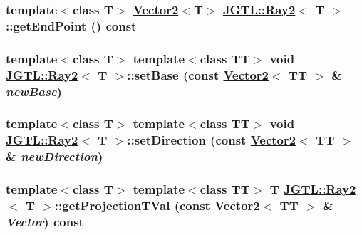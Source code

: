 \hypertarget{class_j_g_t_l_1_1_ray2_2b38de58f57dd042c582fe2f9aa9258a}{
\subsubsection[getEndPoint]{\setlength{\rightskip}{0pt plus 5cm}template$<$class T$>$ \hyperlink{class_j_g_t_l_1_1_vector2}{Vector2}$<$T$>$ \hyperlink{class_j_g_t_l_1_1_ray2}{JGTL::Ray2}$<$ T $>$::get\-End\-Point () const}}
\label{class_j_g_t_l_1_1_ray2_2b38de58f57dd042c582fe2f9aa9258a}


\hypertarget{class_j_g_t_l_1_1_ray2_188eb46e39c7240523863760a7afe756}{
\subsubsection[setBase]{\setlength{\rightskip}{0pt plus 5cm}template$<$class T$>$ template$<$class TT$>$ void \hyperlink{class_j_g_t_l_1_1_ray2}{JGTL::Ray2}$<$ T $>$::set\-Base (const \hyperlink{class_j_g_t_l_1_1_vector2}{Vector2}$<$ TT $>$ \& {\em new\-Base})}}
\label{class_j_g_t_l_1_1_ray2_188eb46e39c7240523863760a7afe756}


\hypertarget{class_j_g_t_l_1_1_ray2_cc31a907c03a3d013694d3f0ac476e47}{
\subsubsection[setDirection]{\setlength{\rightskip}{0pt plus 5cm}template$<$class T$>$ template$<$class TT$>$ void \hyperlink{class_j_g_t_l_1_1_ray2}{JGTL::Ray2}$<$ T $>$::set\-Direction (const \hyperlink{class_j_g_t_l_1_1_vector2}{Vector2}$<$ TT $>$ \& {\em new\-Direction})}}
\label{class_j_g_t_l_1_1_ray2_cc31a907c03a3d013694d3f0ac476e47}


\hypertarget{class_j_g_t_l_1_1_ray2_32b3a18663a108c037713e0473180223}{
\subsubsection[getProjectionTVal]{\setlength{\rightskip}{0pt plus 5cm}template$<$class T$>$ template$<$class TT$>$ T \hyperlink{class_j_g_t_l_1_1_ray2}{JGTL::Ray2}$<$ T $>$::get\-Projection\-TVal (const \hyperlink{class_j_g_t_l_1_1_vector2}{Vector2}$<$ TT $>$ \& {\em Vector}) const}}
\label{class_j_g_t_l_1_1_ray2_32b3a18663a108c037713e0473180223}


